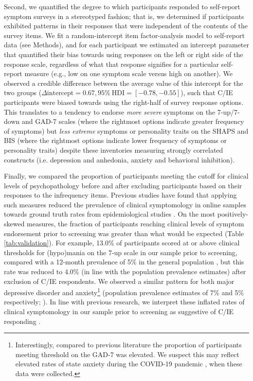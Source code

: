 \documentclass[a4paper,notitlepage,12pt]{article}
\begin{document}
\begin{refsection}[main]
Second, we quantified the degree to which participants responded to self-report symptom surveys in a stereotyped fashion; that is, we determined if participants exhibited patterns in their responses that were independent of the contents of the survey items. We fit a random-intercept item factor-analysis model \cite{maydeu2006random} to self-report data (see Methods), and for each participant we estimated an intercept parameter that quantified their bias towards using responses on the left or right side of the response scale, regardless of what that response signifies for a particular self-report measure (e.g., low on one symptom scale versus high on another). We observed a credible difference between the average value of this intercept for the two groups ($\Delta \text{intercept} = 0.67, 95\% \ \text{HDI} = [-0.78, -0.55]$), such that C/IE participants were biased towards using the right-half of survey response options. This translates to a tendency to endorse \emph{more severe} symptoms on the 7-up/7-down and GAD-7 scales (where the rightmost options indicate greater frequency of symptoms) but \emph{less extreme} symptoms or personality traits on the SHAPS and BIS (where the rightmost options indicate lower frequency of symptoms or personality traits) despite these inventories measuring strongly correlated constructs (i.e. depression and anhedonia, anxiety and behavioral inhibition).

Finally, we compared the proportion of participants meeting the cutoff for clinical levels of psychopathology before and after excluding participants based on their responses to the infrequency items. Previous studies have found that applying such measures reduced the prevalence of clinical symptomology in online samples towards ground truth rates from epidemiological studies \cite{ophir2020turker}. On the most positively-skewed measures, the fraction of participants reaching clinical levels of symptom endorsement prior to screening was greater than what would be expected (Table \ref{tab:validation}). For example, 13.0\% of participants scored at or above clinical thresholds for (hypo)mania on the 7-up scale in our sample prior to screening, compared with a 12-month prevalence of 5\% in the general population \cite{merikangas2007lifetime, merikangas2012true}, but this rate was reduced to 4.0\% (in line with the population prevalence estimates) after exclusion of C/IE respondents. We observed a similar pattern for both major depressive disorder and anxiety\footnote{Interestingly, compared to previous literature the proportion of participants meeting threshold on the GAD-7 was elevated. We suspect this may reflect elevated rates of state anxiety during the COVID-19 pandemic \cite{yarrington2021impact}, when these data were collected.} (population prevalence estimates of 7\% and 5\% respectively; \cite{kessler2012twelve, lowe2008validation, hinz2017psychometric}).  In line with previous research, we interpret these inflated rates of clinical symptomology in our sample prior to screening as suggestive of C/IE responding \cite{ophir2020turker}.


\end{refsection}
\end{document}
